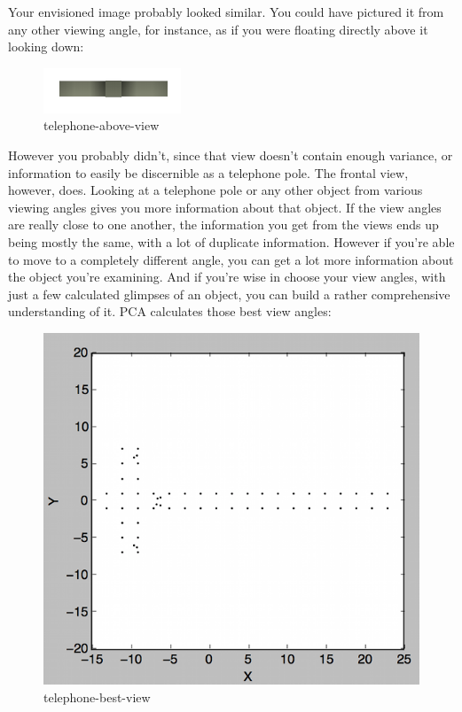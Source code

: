 \documentclass[11pt]{article}
\makeatletter
\def\maxwidth{\ifdim\Gin@nat@width>\linewidth\linewidth
    \else\Gin@nat@width\fi}
\let\Oldincludegraphics\includegraphics
\renewcommand{\includegraphics}[1]{\Oldincludegraphics[width=.8\maxwidth]{#1}}
\makeatother
\begin{document}
Your envisioned image probably looked similar. You could have pictured
it from any other viewing angle, for instance, as if you were floating
directly above it looking down:

\begin{figure}
\centering
\includegraphics{pic/telephone-above.png}
\caption{telephone-above-view}
\end{figure}

However you probably didn't, since that view doesn't contain enough
variance, or information to easily be discernible as a telephone pole.
The frontal view, however, does. Looking at a telephone pole or any
other object from various viewing angles gives you more information
about that object. If the view angles are really close to one another,
the information you get from the views ends up being mostly the same,
with a lot of duplicate information. However if you're able to move to a
completely different angle, you can get a lot more information about the
object you're examining. And if you're wise in choose your view angles,
with just a few calculated glimpses of an object, you can build a rather
comprehensive understanding of it. PCA calculates those best view
angles:

\begin{figure}
\centering
\includegraphics{pic/telephone-best-view.png}
\caption{telephone-best-view}
\end{figure}
\end{document}
